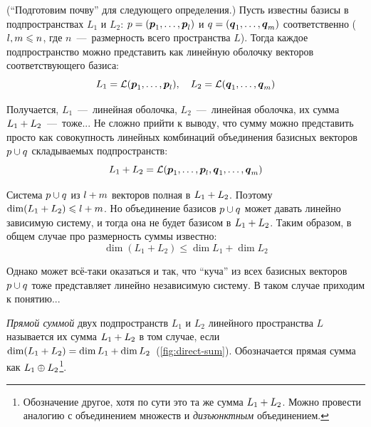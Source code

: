 \documentclass[a4paper,12pt]{article}
\begin{document}
  (``Подготовим почву'' для следующего определения.)
  Пусть известны базисы в подпространствах $L_1$ и $L_2$: $p \hm= (\bds p_1, \ldots, \bds p_l)$ и $q \hm= (\bds q_1, \ldots, \bds q_m)$ соответственно ($l, m \hm\leq n$, где $n$~---~размерность всего пространства $L$).
  Тогда каждое подпространство можно представить как линейную оболочку векторов соответствующего базиса:
  \[
    L_1 = \mathcal L(\boldsymbol p_1, \ldots, \boldsymbol p_l),\quad L_2 = \mathcal L(\boldsymbol q_1, \ldots, \boldsymbol q_m)
  \]
  
  Получается, $L_1$~---~линейная оболочка, $L_2$~---~линейная оболочка, их сумма $L_1 \hm+ L_2$~---~тоже...
  Не сложно прийти к выводу, что сумму можно представить просто как совокупность линейных комбинаций объединения базисных векторов $p \hm\cup q$ складываемых подпространств:
  \begin{equation}\label{eq:sum-as-l-basises}
    L_1 + L_2 = \mathcal L(\boldsymbol p_1, \ldots, \boldsymbol p_l, \boldsymbol q_1, \ldots, \boldsymbol q_m)
  \end{equation}
  
  Система $p \hm\cup q$ из $l \hm+ m$ векторов полная в $L_1 \hm+ L_2$.
  Поэтому $\dim(L_1 + L_2) \hm\leq l \hm+ m$.
  Но объединение базисов $p \hm\cup q$ может давать линейно зависимую систему, и тогда она не будет базисом в $L_1 \hm+ L_2$.
  Таким образом, в общем случае про размерность суммы известно:
  \[
    \dim(L_1 + L_2) \leq \dim L_1 + \dim L_2
  \]
  
  Однако может всё-таки оказаться и так, что ``куча'' из всех базисных векторов $p \hm\cup q$ тоже представляет линейно независимую систему.
  В таком случае приходим к понятию...
  
  \begin{definition}
    \emph{Прямой суммой} двух подпространств $L_1$ и $L_2$ линейного пространства $L$ называется их сумма $L_1 \hm+ L_2$ в том случае, если $\dim(L_1 \hm+ L_2) \hm= \dim L_1 \hm+ \dim L_2$~(\ref{fig:direct-sum}).
    Обозначается прямая сумма как $L_1 \hm\oplus L_2$\footnote{Обозначение другое, хотя по сути это та же сумма $L_1 \hm+ L_2$. Можно провести аналогию с объединением множеств и \emph{дизъюнктным} объединением.}.
  \end{definition}
  
\end{document}
